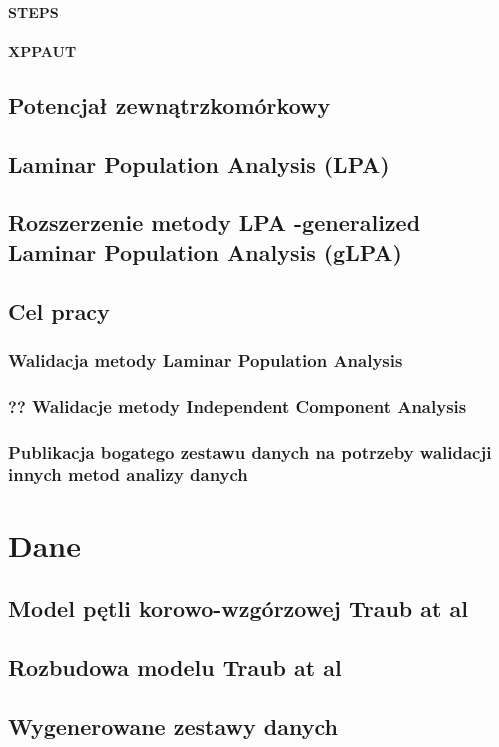 \documentclass[a4paper,12pt,polish]{book}
\begin{document}
\subsubsection{STEPS}
\subsubsection{XPPAUT}
\section{Potencjał zewnątrzkomórkowy}
\section{Laminar Population Analysis (LPA)}

\section{Rozszerzenie metody LPA -generalized Laminar Population Analysis (gLPA)}
\section{Cel pracy}
\subsection{Walidacja metody Laminar Population Analysis}
\subsection{??  Walidacje metody Independent Component Analysis}
\subsection{Publikacja bogatego zestawu danych na potrzeby walidacji innych metod analizy danych}


\chapter{Dane}
\section{Model pętli korowo-wzgórzowej Traub at al}
\section{Rozbudowa modelu Traub at al}
\section{Wygenerowane zestawy danych}
\end{document}
